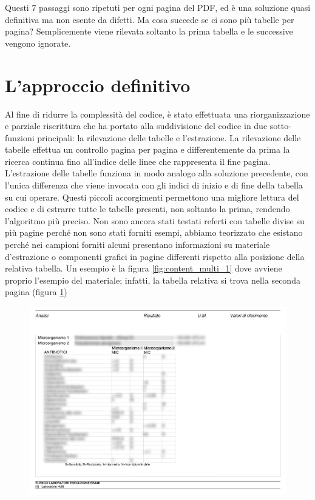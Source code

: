 Questi 7 passaggi sono ripetuti per ogni pagina del PDF, ed è una soluzione quasi definitiva ma non esente da difetti. Ma cosa succede se ci sono più tabelle per pagina? Semplicemente viene rilevata soltanto la prima tabella e le successive vengono ignorate.
\section{L'approccio definitivo}
Al fine di ridurre la complessità del codice, è stato effettuata una riorganizzazione e parziale riscrittura che ha portato alla suddivisione del codice in due sotto-funzioni principali: la rilevazione delle tabelle e l'estrazione.
La rilevazione delle tabelle effettua un controllo pagina per pagina e differentemente da prima la ricerca continua fino all'indice delle linee che rappresenta il fine pagina.
L'estrazione delle tabelle funziona in modo analogo alla soluzione precedente, con l'unica differenza che viene invocata con gli indici di inizio e di fine della tabella su cui operare. 
Questi piccoli accorgimenti permettono una migliore lettura del codice e di estrarre tutte le tabelle presenti, non soltanto la prima, rendendo l'algoritmo più preciso.
Non sono ancora stati testati referti con tabelle divise su più pagine perché non sono stati forniti esempi, abbiamo teorizzato che esistano perché nei campioni forniti alcuni presentano informazioni su materiale d'estrazione o componenti grafici in pagine differenti rispetto alla posizione della relativa tabella. Un esempio è la figura \ref{fig:content_multi_1} dove avviene proprio l'esempio del materiale; infatti, la tabella relativa si trova nella seconda pagina (figura \ref{fig:content_multi_2})
\newpage
\begin{figure}[h!]
	\centering
	\includegraphics[width=.99\columnwidth]{images/content_multi_p2.png}
	\caption{\textit{}}
	\label{fig:content_multi_2}
\end{figure} 

